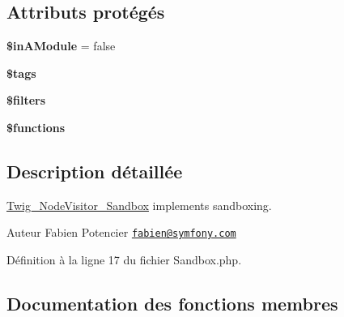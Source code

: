 \subsection*{Attributs protégés}
\begin{DoxyCompactItemize}
\item 
{\bfseries \$in\+A\+Module} = false\hypertarget{class_twig___node_visitor___sandbox_a43c3bc6b09e084657615aca853997b39}{}\label{class_twig___node_visitor___sandbox_a43c3bc6b09e084657615aca853997b39}

\item 
{\bfseries \$tags}\hypertarget{class_twig___node_visitor___sandbox_a475a6a63b85186663d34151bcbd21590}{}\label{class_twig___node_visitor___sandbox_a475a6a63b85186663d34151bcbd21590}

\item 
{\bfseries \$filters}\hypertarget{class_twig___node_visitor___sandbox_ae222f32233a38635bef58d24a13c9df5}{}\label{class_twig___node_visitor___sandbox_ae222f32233a38635bef58d24a13c9df5}

\item 
{\bfseries \$functions}\hypertarget{class_twig___node_visitor___sandbox_aa75daea491817f3b64daa2f51128bcdf}{}\label{class_twig___node_visitor___sandbox_aa75daea491817f3b64daa2f51128bcdf}

\end{DoxyCompactItemize}


\subsection{Description détaillée}
\hyperlink{class_twig___node_visitor___sandbox}{Twig\+\_\+\+Node\+Visitor\+\_\+\+Sandbox} implements sandboxing.

\begin{DoxyAuthor}{Auteur}
Fabien Potencier \href{mailto:fabien@symfony.com}{\tt fabien@symfony.\+com} 
\end{DoxyAuthor}


Définition à la ligne 17 du fichier Sandbox.\+php.



\subsection{Documentation des fonctions membres}
